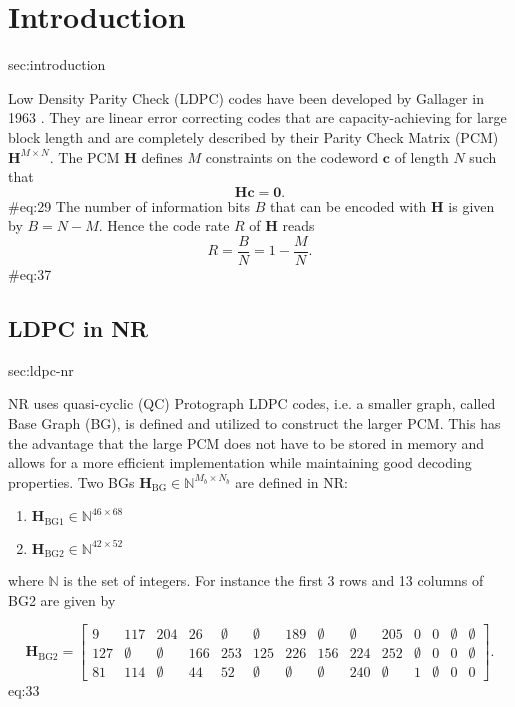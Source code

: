 \documentclass{article}
\def\0{\mathbf{0}}
\def\c{\mathbf{c}}
\def\H{\mathbf{H}}
\def\Hbg{\mathbf{H}_\mathrm{BG}}
\def\Hbgo{\mathbf{H}_\mathrm{BG1}}
\def\Hbgt{\mathbf{H}_\mathrm{BG2}}
\def\Mb{{M_b}}
\def\Nb{{N_b}}
\def\Nbb{\mathbb{N}}
\begin{document}
\newpage
\tableofcontents

\newpage
\section{Introduction}
{sec:introduction}

Low Density Parity Check (LDPC) codes have been developed by Gallager in 1963 \cite{gallager1962low}. They are linear error correcting codes that are capacity-achieving for large block length and are completely described by their Parity Check Matrix (PCM) $\H^{M\times N}$. The PCM $\H$ defines $M$ constraints on the codeword $\c$ of length $N$ such that
\begin{equation}
	\H\c = \0.
\end{equation} {#eq:29}
The number of information bits $B$ that can be encoded with $\H$ is given by $B=N-M$. Hence the code rate $R$ of $\H$ reads
\begin{equation}
  R = \frac{B}{N} = 1-\frac{M}{N}.
\end{equation} {#eq:37}


\subsection{LDPC in NR}
{sec:ldpc-nr}

NR uses quasi-cyclic (QC) Protograph LDPC codes, i.e. a smaller graph, called Base Graph (BG), is defined and utilized to construct the larger PCM. This has the advantage that the large PCM does not have to be stored in memory and allows for a more efficient implementation while maintaining good decoding properties.
Two BGs $\Hbg\in\Nbb^{\Mb\times \Nb}$ are defined in NR:
\begin{enumerate}
\item $\Hbgo\in\Nbb^{46\times 68}$
\item $\Hbgt\in\Nbb^{42\times 52}$
\end{enumerate}
where $\Nbb$ is the set of integers. For instance the first 3 rows and 13 columns of BG2 are given by

\setcounter{MaxMatrixCols}{30}
\begin{equation*}
  \Hbgt =
  \begin{bmatrix}
    9   & 117       & 204       & 26  & \emptyset & \emptyset & 189       & \emptyset & \emptyset & 205       & 0         & 0         & \emptyset & \emptyset \\
    127 & \emptyset & \emptyset & 166 & 253       & 125       & 226       & 156       & 224       & 252       & \emptyset & 0         & 0         & \emptyset \\
    81  & 114       & \emptyset & 44  & 52        & \emptyset & \emptyset & \emptyset & 240       & \emptyset & 1         & \emptyset & 0         & 0
  \end{bmatrix}.
\end{equation*}{eq:33}
\end{document}

